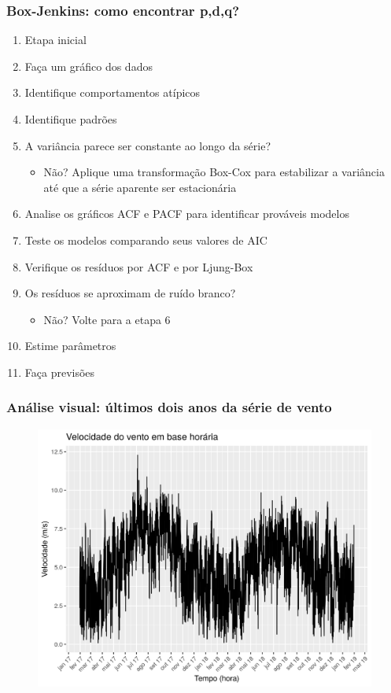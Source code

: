 \documentclass[mathserif,serif]{beamer}
\begin{document}
\begin{frame}
	\frametitle{Box-Jenkins: como encontrar p,d,q?}

	\begin{enumerate}
		\item<1-> Etapa inicial
		\item<2-> Faça um gráfico dos dados
		\item<3-> Identifique comportamentos atípicos
		\item<4-> Identifique padrões
		\item<5-> A variância parece ser constante ao longo da série?
		\begin{itemize}
			\item<5-> 	Não? Aplique uma transformação Box-Cox para estabilizar a variância até que a série aparente ser estacionária
		\end{itemize}
		\item<6-> 	Analise os gráficos ACF e PACF para identificar prováveis modelos		\item Teste os modelos comparando seus valores de AIC
		\item<7-> Verifique os resíduos por ACF e por Ljung-Box
		\item<8-> Os resíduos se aproximam de ruído branco?
			\begin{itemize}
				\item<8-> Não? Volte para a etapa 6
			\end{itemize}
		\item<9-> Estime parâmetros
		\item<10-> Faça previsões
	\end{enumerate}	
\end{frame}

\begin{frame}
	\frametitle{Análise visual: últimos dois anos da série de vento}
	\begin{figure}
		\centering
		\includegraphics[scale=0.6]{entire_series_hourly_basis}
	\end{figure}
\end{frame}
\end{document}
